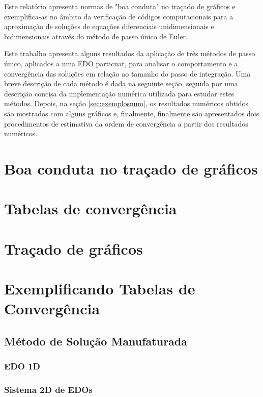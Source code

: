 \documentclass[twocolumn,amsmath,amssymb,floatfix]{revtex4}
\begin{document}
Este relatório apresenta normas de "boa conduta" no traçado de gráficos e exemplifica-as no âmbito da verificação de códigos computacionais para a aproximação de soluções de equações diferenciais unidimensionais e bidimensionais através do método de passo único de Euler.


Este trabalho apresenta alguns resultados da aplicação de três métodos de passo único, aplicados a uma EDO particuar, para analisar o comportamento e a convergência das soluções em relação ao tamanho do passo de integração. Uma breve descrição de cada método é dada na seguinte seção, seguida por uma descrição concisa da implementação numérica utilizada para estudar estes métodos. Depois, na seção \ref{sec:exemplosnum}, os resultados numéricos obtidos são mostrados com alguns gráficos e, finalmente, finalmente são apresentados dois procedimentos de estimativa da ordem de convergência a partir dos resultados numéricos.

\section{Boa conduta no traçado de gráficos}
\label{sec:boaCondutaGraficos}

\section{Tabelas de convergência}
\label{sec:tabelasDeConvergencia}

\section{Traçado de gráficos}
\label{sec:tracadoDeGraficos}

\section{Exemplificando Tabelas de Convergência}
\label{sec:tabelasDeConvergencia}

\subsection{Método de Solução Manufaturada}
\label{subsec:solucaoManufaturada}

\subsubsection{EDO 1D}
\label{subsubsec:edo1D}

\subsubsection{Sistema 2D de EDOs}
\label{subsubsec:sistemaDeEdos2D}
\end{document}
